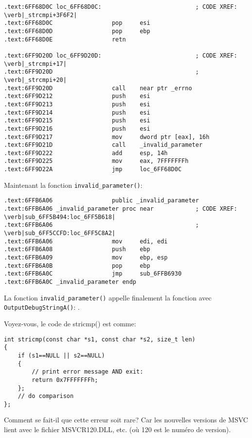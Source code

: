 \begin{lstlisting}[style=customasmx86]
.text:6FF68D0C loc_6FF68D0C:                           ; CODE XREF: \verb|_strcmpi+3F6F2|
.text:6FF68D0C                 pop     esi
.text:6FF68D0D                 pop     ebp
.text:6FF68D0E                 retn

.text:6FF9D20D loc_6FF9D20D:                           ; CODE XREF: \verb|_strcmpi+17|
.text:6FF9D20D                                         ; \verb|_strcmpi+20|
.text:6FF9D20D                 call    near ptr _errno
.text:6FF9D212                 push    esi
.text:6FF9D213                 push    esi
.text:6FF9D214                 push    esi
.text:6FF9D215                 push    esi
.text:6FF9D216                 push    esi
.text:6FF9D217                 mov     dword ptr [eax], 16h
.text:6FF9D21D                 call    _invalid_parameter
.text:6FF9D222                 add     esp, 14h
.text:6FF9D225                 mov     eax, 7FFFFFFFh
.text:6FF9D22A                 jmp     loc_6FF68D0C
\end{lstlisting}

Maintenant la fonction \verb|invalid_parameter()|:

\begin{lstlisting}[style=customasmx86]
.text:6FFB6A06                 public _invalid_parameter
.text:6FFB6A06 _invalid_parameter proc near            ; CODE XREF: \verb|sub_6FF5B494:loc_6FF5B618|
.text:6FFB6A06                                         ; \verb|sub_6FF5CCFD:loc_6FF5C8A2|
.text:6FFB6A06                 mov     edi, edi
.text:6FFB6A08                 push    ebp
.text:6FFB6A09                 mov     ebp, esp
.text:6FFB6A0B                 pop     ebp
.text:6FFB6A0C                 jmp     sub_6FFB6930
.text:6FFB6A0C _invalid_parameter endp
\end{lstlisting}

La fonction \verb|invalid_parameter()| appelle finalement la fonction avec \verb|OutputDebugStringA()|:
.

Voyez-vous, le code de stricmp() est comme:

\begin{lstlisting}[style=customc]
int stricmp(const char *s1, const char *s2, size_t len)
{
	if (s1==NULL || s2==NULL)
	{
		// print error message AND exit:
		return 0x7FFFFFFFh;
	};
	// do comparison
};
\end{lstlisting}

Comment se fait-il que cette erreur soit rare? Car les nouvelles versions de MSVC
lient avec le fichier MSVCR120.DLL, etc. (où 120 est le numéro de version).

